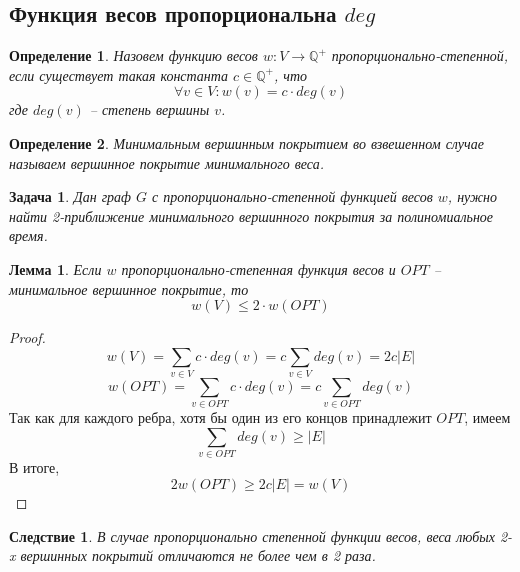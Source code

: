 \documentclass{article}
\newtheorem{definition}{Определение}
\newtheorem{lemma}{Лемма}
\newtheorem{task}{Задача}
\newtheorem{corollary}{Следствие}
\theoremstyle{definition}
\begin{document}
  \subsection{Функция весов пропорциональна $deg$}
  \begin{definition}
    Назовем функцию весов $w: V \rightarrow \mathbb{Q}^+$ пропорционально-степенной,
    если существует такая константа $c \in \mathbb{Q}^+$, что
    $$\forall v \in V: w(v) = c \cdot deg(v)$$
    где $deg(v)$ -- степень вершины $v$.
  \end{definition}
  \begin{definition}
    Минимальным вершинным покрытием во взвешенном случае называем вершинное покрытие минимального веса.
  \end{definition}
  \begin{task}
    Дан граф $G$ с пропорционально-степенной функцией весов $w$, нужно найти
    2-приближение минимального вершинного покрытия за полиномиальное время.
  \end{task}
  \begin{lemma}
    Если $w$ пропорционально-степенная функция весов и $OPT$ -- минимальное вершинное покрытие,
    то 
    $$w(V) \le 2\cdot w(OPT)$$
  \end{lemma}
  \begin{proof}
    $$w(V) = \sum_{v\in V}c\cdot deg(v) = c \sum_{v \in V} deg(v) = 2c|E|$$
    $$w(OPT) = \sum_{v \in OPT}c\cdot deg(v) = c \sum_{v \in OPT}deg(v)$$
    Так как для каждого ребра, хотя бы один из его концов принадлежит $OPT$,
    имеем 
    $$\sum_{v \in OPT} deg(v) \ge |E|$$
    В итоге,
    $$2w(OPT) \ge 2c|E| = w(V)$$
  \end{proof}
  \begin{corollary}\label{corollarySimpleWeight}
    В случае пропорционально степенной функции весов, веса любых 2-x вершинных покрытий
    отличаются не более чем в 2 раза.
  \end{corollary}
\end{document}
